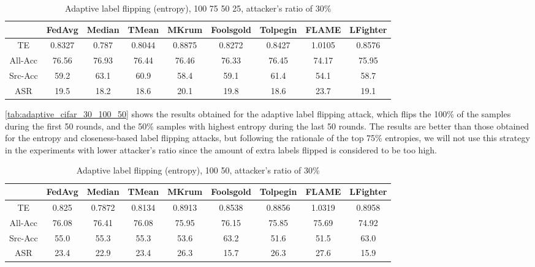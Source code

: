 \begin{table}[h!]
        \centering
        \small
        \begin{adjustbox}{center}
        \begin{tabular}{|c|c|c|c|c|c|c|c|c|}
            \hline
            & FedAvg & Median & TMean & MKrum & Foolsgold & Tolpegin & FLAME & LFighter \\
            \hline
            TE & 0.8327 & 0.787 & 0.8044 & 0.8875 & 0.8272 & 0.8427 & 1.0105 & 0.8576 \\
            \hline
            All-Acc & 76.56 & 76.93 & 76.44 & 76.46 & 76.33 & 76.45 & 74.17 & 75.95 \\
            \hline
            Src-Acc & 59.2 & 63.1 & 60.9 & 58.4 & 59.1 & 61.4 & 54.1 & 58.7 \\
            \hline
            ASR & 19.5 & 18.2 & 18.6 & 20.1 & 19.8 & 18.6 & 23.7 & 19.1 \\
            \hline
        \end{tabular}
        \end{adjustbox}
        \caption{Adaptive label flipping (entropy), 100 75 50 25, attacker's ratio of 30\%}
        \label{tab:adaptive_cifar_30_100_75_50_25}
    \end{table}
    
\autoref{tab:adaptive_cifar_30_100_50} shows the results obtained for the adaptive label flipping attack, which flips the 100\% of the samples during the first 50 rounds, and the 50\% samples with highest entropy during the last 50 rounds. The results are better than those obtained for the entropy and closeness-based label flipping attacks, but following the rationale of the top 75\% entropies, we will not use this strategy in the experiments with lower attacker's ratio since the amount of extra labels flipped is considered to be too high.

\begin{table}[h!]
        \centering
        \small
        \begin{adjustbox}{center}
        \begin{tabular}{|c|c|c|c|c|c|c|c|c|}
            \hline
            & FedAvg & Median & TMean & MKrum & Foolsgold & Tolpegin & FLAME & LFighter \\
            \hline
            TE & 0.825 & 0.7872 & 0.8134 & 0.8913 & 0.8538 & 0.8856 & 1.0319 & 0.8958 \\
            \hline
            All-Acc & 76.08 & 76.41 & 76.08 & 75.95 & 76.15 & 75.85 & 75.69 & 74.92 \\
            \hline
            Src-Acc & 55.0 & 55.3 & 55.3 & 53.6 & 63.2 & 51.6 & 51.5 & 63.0 \\
            \hline
            ASR & 23.4 & 22.9 & 23.4 & 26.3 & 15.7 & 26.3 & 27.6 & 15.9 \\
            \hline
        \end{tabular}
        \end{adjustbox}
        \caption{Adaptive label flipping (entropy), 100 50, attacker's ratio of 30\%}
        \label{tab:adaptive_cifar_30_100_50}
    \end{table}
    

